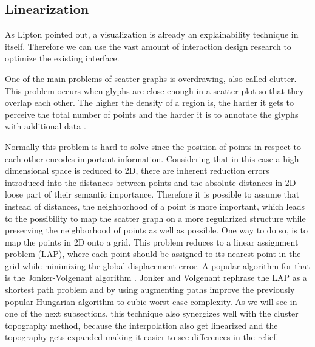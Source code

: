 \subsection{Linearization}

As Lipton \cite{liptonMythosModelInterpretability2016a} pointed out, a visualization is already an explainability technique in itself. Therefore we can use the vast amount of interaction design research to optimize the existing interface. 

One of the main problems of scatter graphs is overdrawing, also called clutter. This problem occurs when glyphs are close enough in a scatter plot so that they overlap each other. The higher the density of a region is, the harder it gets to perceive the total number of points and the harder it is to annotate the glyphs with additional data \cite{mayorgaSplatterplotsOvercomingOverdraw2013}. 

Normally this problem is hard to solve since the position of points in respect to each other encodes important information. Considering that in this case a high dimensional space is reduced to 2D, there are inherent reduction errors introduced into the distances between points and the absolute distances in 2D loose part of their semantic importance. Therefore it is possible to assume that instead of distances, the neighborhood of a point is more important, which leads to the possibility to map the scatter graph on a more regularized structure while preserving the neighborhood of points as well as possible. One way to do so, is to map the points in 2D onto a grid. This problem reduces to a linear assignment problem (LAP), where each point should be assigned to its nearest point in the grid while minimizing the global displacement error. A popular algorithm for that is the Jonker-Volgenant algorithm \cite{jonkerShortestAugmentingPath1987}. Jonker and Volgenant rephrase the LAP as a shortest path problem and by using augmenting paths improve the previously popular Hungarian algorithm to cubic worst-case complexity. As we will see in one of the next subsections, this technique also synergizes well with the cluster topography method, because the interpolation also get linearized and the topography gets expanded making it easier to see differences in the relief.


